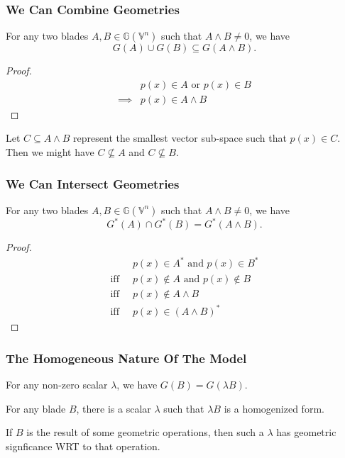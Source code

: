 \documentclass{beamer}
\newcommand{\G}{\mathbb{G}}
\newcommand{\V}{\mathbb{V}}
\begin{document}
\begin{frame}
\frametitle{We Can Combine Geometries}
For any two blades $A,B\in\G(\V^n)$ such that $A\wedge B\neq 0$, we have
\begin{equation*}
G(A)\cup G(B)\subseteq G(A\wedge B).
\end{equation*}
\begin{proof}
\begin{align*}
 & \mbox{$p(x)\in A$ or $p(x)\in B$} \\
\implies & \mbox{$p(x)\in A\wedge B$}
\end{align*}
\end{proof}
Let $C\subseteq A\wedge B$ represent the smallest vector sub-space such that $p(x)\in C$.
Then we might have $C\not\subseteq A$ and $C\not\subseteq B$.
\end{frame}

\begin{frame}
\frametitle{We Can Intersect Geometries}
\begin{lemma}
For any two blades $A,B\in\G(\V^n)$ such that $A\wedge B\neq 0$,
we have
\begin{equation*}
G^*(A)\cap G^*(B)=G^*(A\wedge B).
\end{equation*}
\end{lemma}
\begin{proof}
\begin{align*}
 & \mbox{$p(x)\in A^*$ and $p(x)\in B^*$} \\
\mbox{iff}\;\; & \mbox{$p(x)\not\in A$ and $p(x)\not\in B$} \\
\mbox{iff}\;\; & \mbox{$p(x)\not\in A\wedge B$} \\
\mbox{iff}\;\; & \mbox{$p(x)\in(A\wedge B)^*$}
\end{align*}
\end{proof}
\end{frame}

\begin{frame}
\frametitle{The Homogeneous Nature Of The Model}
For any non-zero scalar $\lambda$, we have $G(B)=G(\lambda B)$.

For any blade $B$, there is a scalar $\lambda$ such that $\lambda B$ is a homogenized form.

If $B$ is the result of some geometric operations, then such a $\lambda$ has geometric signficance
WRT to that operation.
\end{frame}
\end{document}
